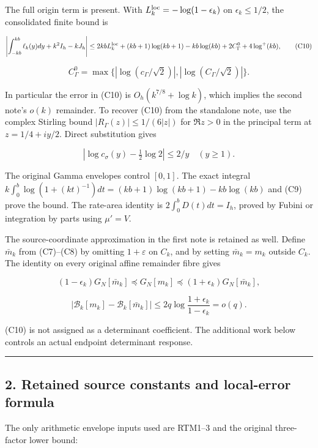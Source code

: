 The full origin term is present. With \(L_k^{\rm loc}=-\log(1-\epsilon_k)\) on \(\epsilon_k\le1/2\), the consolidated finite bound is

\[
\left|\int_{-kb}^{kb}\ell_k(y)dy+k^2I_h-kJ_h\right|
\le 2kbL_k^{\rm loc}+(kb+1)\log(kb+1)-kb\log(kb)
+2C_\Gamma^0+4\log^+(kb),
\tag{C10}
\]

\[
C_\Gamma^0=\max\{|\log(c_\Gamma/\sqrt2)|,
|\log(C_\Gamma/\sqrt2)|\}.
\]

In particular the error in (C10) is \(O_h(k^{7/8}+\log k)\), which implies the second note's \(o(k)\) remainder. To recover (C10) from the standalone note, use the complex Stirling bound
\(|R_\Gamma(z)|\le1/(6|z|)\) for \(\Re z>0\) in the principal term at \(z=1/4+iy/2\). Direct substitution gives

\[
|\log c_\sigma(y)-\tfrac12\log2|\le2/y\quad(y\ge1).
\]

The original Gamma envelopes control \([0,1]\). The exact integral
\(k\int_0^b\log(1+(kt)^{-1})dt
=(kb+1)\log(kb+1)-kb\log(kb)\)
and (C9) prove the bound. The rate-area identity is
\(2\int_0^bD(t)dt=I_h\), proved by Fubini or integration by parts using \(\mu'=V\).

The source-coordinate approximation in the first note is retained as well. Define \(\bar m_k\) from (C7)--(C8) by omitting \(1+\varepsilon\) on \(C_k\), and by setting \(\bar m_k=m_k\) outside \(C_k\). The identity on every original affine remainder fibre gives

\[
(1-\epsilon_k)G_N[\bar m_k]\preceq G_N[m_k]
\preceq(1+\epsilon_k)G_N[\bar m_k],
\]

\[
|\mathcal B_k[m_k]-\mathcal B_k[\bar m_k]|
\le2q\log\frac{1+\epsilon_k}{1-\epsilon_k}=o(q).
\tag{C11}
\]

(C10) is not assigned as a determinant coefficient. The additional work below controls an actual endpoint determinant response.

\begin{center}\rule{0.5\linewidth}{0.5pt}\end{center}

\subsection{2. Retained source constants and local-error formula}\label{retained-source-constants-and-local-error-formula}

The only arithmetic envelope inputs used are RTM1--3 and the original three-factor lower bound:

